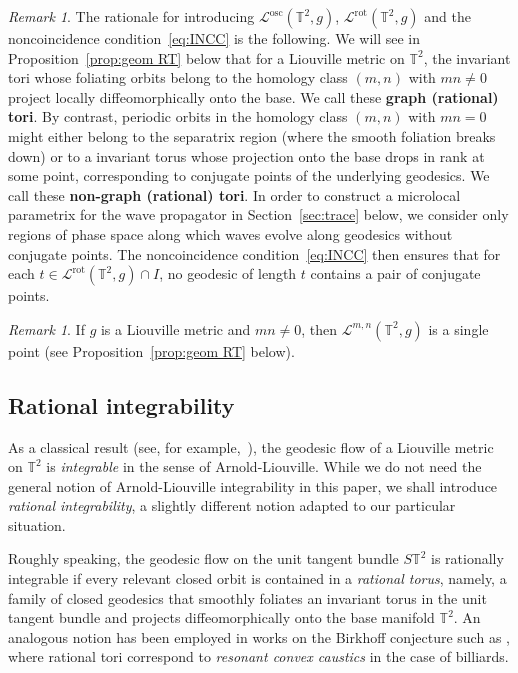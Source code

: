 \documentclass[11pt,letterpaper,oneside]{amsart}
\newcommand{\T}{\mathbb{T}}
\theoremstyle{definition}
\theoremstyle{remark}
\newtheorem{rema}[theo]{Remark}
\theoremstyle{definition}
\theoremstyle{remark}
\newtheorem*{remark}{Remark}
\newcommand{\CL}{\mathcal{L}}
\DeclareMathOperator{\rot}{rot}
\DeclareMathOperator{\osc}{osc}
\begin{document}
\begin{rema}
    The rationale for introducing ${\CL^{\osc}} (\T^2,g)$, ${\CL^{\rot}} (\T^2, g)$ and the noncoincidence condition~\eqref{eq:INCC} is the following. We will see in Proposition~\ref{prop:geom RT} below that for a Liouville metric on $\T^2$, the invariant tori whose foliating orbits belong to the homology class $(m,n)$ with $mn \neq 0$ project locally diffeomorphically onto the base. We call these \textbf{graph (rational) tori}. By contrast, periodic orbits in the homology class $(m,n)$ with $mn = 0$ might either belong to the separatrix region (where the smooth foliation breaks down) or to a {invariant} torus whose projection onto the base drops in rank at some point, corresponding to conjugate points of the underlying geodesics. We call these \textbf{non-graph (rational) tori}. In order to construct a microlocal parametrix for the wave propagator in Section~\ref{sec:trace} below, we consider only regions of phase space along which waves evolve along geodesics without conjugate points. The noncoincidence condition~\eqref{eq:INCC} then ensures that for each $t \in \CL^{\rot} (\T^2,g) \cap I$, no geodesic of length $t$ contains a pair of conjugate points.
\end{rema}


\begin{remark}
    If $g$ is a Liouville metric and $mn \neq 0$, then $\CL^{m,n}(\T^2,g)$ is a single point (see Proposition~\ref{prop:geom RT} below).
\end{remark}




\subsection{Rational integrability}

As a classical result (see, for example,~\cite{henheik2025deformational}), the geodesic flow of a Liouville metric on $\T^2$ is \emph{integrable} in the sense of Arnold-Liouville. 
While we do not need the general notion of Arnold-Liouville integrability in this paper, we shall introduce \emph{rational integrability}, a slightly different notion adapted to our particular situation.

\medskip

Roughly speaking, the geodesic flow on the unit tangent bundle $S\T^2$ is rationally integrable if every relevant closed orbit is contained in a \emph{rational torus}, namely, a family of closed geodesics that smoothly foliates an invariant torus in the unit tangent bundle and projects diffeomorphically onto the base manifold $\T^2$.
An analogous notion has been employed in works on the Birkhoff conjecture such as \cite{KaAvDS16,KaSo16,koval2023local}, where rational tori correspond to \emph{resonant convex caustics} in the case of billiards.
\end{document}
